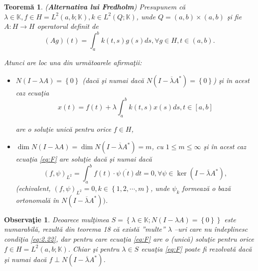 \documentclass[a4paper,12pt,oneside]{report}
\newtheorem{theorem}{Teorem\u a}
\newtheorem{remark}{Observa\c{t}ie}
\begin{document}
\begin{theorem} (\textbf{Alternativa lui Fredholm})
Presupunem c\u{a} \(\lambda \in \mathbb{K}, f\in H = L^{2}\left (a,b;\mathbb{K} \right ), k\in L^{2}\left ( Q; \mathbb{K} \right )\), unde \(Q = \left ( a,b \right )\times \left ( a,b \right )\) \c{s}i fie \(A : H \rightarrow H\) operatorul definit de
\begin{displaymath}
\left (Ag  \right )\left ( t \right ) = \int_{a}^{b}k\left ( t,s \right )g\left ( s \right )ds, \forall g \in H, t \in \left ( a,b \right ).
\end{displaymath}

\noindent Atunci are loc una din urm\u{a}toarele afirma\c{t}ii:
\begin{itemize}
\item \(N\left ( I - \lambda A \right ) = \left \{ 0 \right \}\) (dac\u{a} \c{s}i numai dac\u{a} \(N\left ( I - \overline{\lambda} A^{\ast } \right ) = \left \{ 0 \right \}\)) \c{s}i \^{i}n acest caz ecua\c{t}ia
\begin{displaymath}
x\left ( t \right ) = f\left ( t \right ) + \lambda \int_{a}^{b}k\left ( t,s \right )x\left ( s \right )ds, t\in \left [ a,b \right ] \label{eq:F} \tag{F}
\end{displaymath}
        		      		      		
are o solu\c{t}ie unic\u{a} pentru orice \(f\in H\),
\item \(\dim N\left ( I - \lambda A \right ) = \dim N\left ( I - \overline{\lambda} A^{\ast } \right ) = m\), cu \(1\leq m\leq \infty\) \c{s}i \^{i}n acest caz ecua\c{t}ia \ref{eq:F} are solu\c{t}ie dac\u{a} \c{s}i numai dac\u{a}
\begin{displaymath}
\left ( f, \psi  \right )_{L^{2}} = \int_{a}^{b}f\left ( t \right )\cdot \overline{\psi \left ( t \right )}dt = 0, \forall \psi \in \ker \left ( I - \overline{\lambda}A^{\ast } \right ),
\end{displaymath}
(echivalent, \(\left ( f, \psi  \right )_{L^{2}} = 0, k\in \left \{ 1,2,\cdots,m \right \}\), unde \(\psi _{k}\) formeaz\u{a} o baz\u{a} ortonomal\u{a} \^{i}n \(N\left ( I - \overline{\lambda}A^{\ast } \right ))\).
\end{itemize}
\end{theorem}

\begin{remark}
Deoarece mul\c{t}imea \(S = \left \{\lambda \in \mathbb{K} ; N\left ( I - \lambda A \right ) = \left \{ 0 \right \}\right \}\) este numarabil\u{a}, rezult\u{a} din teorema 18 c\u{a} exist\u{a} ”multe” \(\lambda\) –uri care nu \^{i}ndeplinesc condi\c{t}ia \ref{eq:2.22}, dar  pentru care ecua\c{t}ia \ref{eq:F} are o (unic\u{a}) solu\c{t}ie pentru orice \(f\in H = L^{2}\left ( a,b;\mathbb{K} \right )\). Chiar \c{s}i pentru \(\lambda \in S\) ecua\c{t}ia \ref{eq:F} poate fi rezolvat\u{a} dac\u{a} \c{s}i numai dac\u{a} \(f \perp N\left ( I - \overline{\lambda }A^{\ast } \right )\).
\end{remark}
\end{document}

